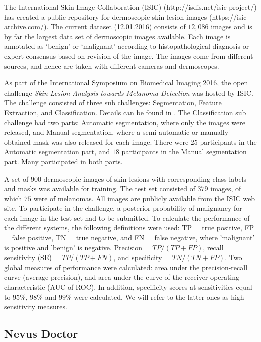 \documentclass[a4paper,12pt]{article}
\begin{document}
The International Skin Image Collaboration (ISIC) (http://isdis.net/isic-project/) has created a public repository for dermoscopic skin lesion images (https://isic-archive.com/). 
The current dataset (12.01.2016) consists of $12,086$ images and is by far the largest data set of dermoscopic images available. 
Each image is annotated as `benign' or `malignant' according to histopathological diagnosis or expert consensus based on revision of the image. 
The images come from different sources, and hence are taken with different cameras and dermoscopes. 

As part of the International Symposium on Biomedical Imaging 2016, the open challenge {\it Skin Lesion Analysis towards Melanoma Detection} was hosted by ISIC. 
The challenge consisted of three sub challenges: Segmentation, Feature Extraction, and Classification. 
Details can be found in \cite{Gutman2016Skin}. 
The Classification sub challenge had two parts: Automatic segmentation, where only the images were released, and Manual segmentation, where a semi-automatic or manually obtained mask was also released for each image. 
There were $25$ participants in the Automatic segmentation part, and $18$ participants in the Manual segmentation part. 
Many participated in both parts. 

A set of $900$ dermoscopic images of skin lesions with corresponding class labels and masks was available for training. 
The test set consisted of $379$ images, of which $75$ were of melanomas. 
All images are publicly available from the ISIC web site. 
To participate in the challenge, a posterior probability of malignancy for each image in the test set had to be submitted. 
To calculate the performance of the different systems, the following definitions were used: TP = true positive, FP = false positive, TN = true negative, and FN = false negative, where 'malignant' is positive and 'benign' is negative. 
Precision = $TP/(TP+FP)$, recall = sensitivity (SE) = $TP/(TP+FN)$, and specificity = $TN/(TN+FP)$. 
Two global measures of performance were calculated: area under the precision-recall curve (average precision), and area under the curve of the receiver-operating characteristic (AUC of ROC). 
In addition, specificity scores at sensitivities equal to $95\%$, $98\%$ and $99\%$ were calculated. 
We will refer to the latter ones as high-sensitivity measures. 

\subsection{Nevus Doctor} \label{sec:NevusDoctor}
\end{document}
